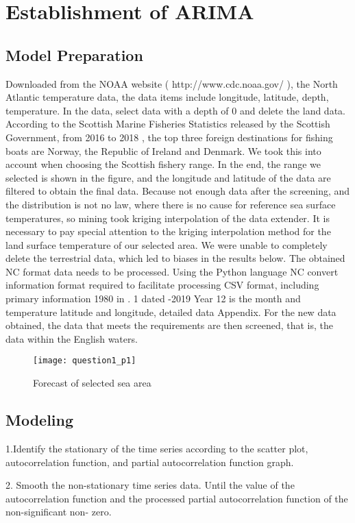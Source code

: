 \documentclass{mcmthesis}
\begin{document}
\section{Establishment of ARIMA}
\subsection{Model Preparation}
Downloaded from the NOAA website ( http://www.cdc.noaa.gov/ ), the North Atlantic temperature data, the data items include longitude, latitude, depth, temperature. In the data, select data with a depth of 0 and delete the land data. According to the Scottish Marine Fisheries Statistics released by the Scottish Government, from 2016 to 2018 , the top three foreign destinations for fishing boats are Norway, the Republic of Ireland and Denmark. We took this into account when choosing the Scottish fishery range. In the end, the range we selected is shown in the figure, and the longitude and latitude of the data are filtered to obtain the final data. Because not enough data after the screening, and the distribution is not no law, where there is no cause for reference sea surface temperatures, so mining took kriging interpolation of the data extender. It is necessary to pay special attention to the kriging interpolation method for the land surface temperature of our selected area. We were unable to completely delete the terrestrial data, which led to biases in the results below.
The obtained NC format data needs to be processed. Using the Python language NC convert information format required to facilitate processing CSV format, including primary information 1980 in . 1 dated -2019 Year 12 is the month and temperature latitude and longitude, detailed data Appendix.
For the new data obtained, the data that meets the requirements are then screened, that is, the data within the English waters.
\begin{figure}[h]
	\small
	\centering
	\texttt{[image: question1\_p1]}
	\caption{Forecast of selected sea area} \label{fig:aa}
\end{figure}

\subsection{Modeling}
1.Identify the stationary of the time series according to the scatter plot, autocorrelation function, and partial autocorrelation function graph.

2. Smooth the non-stationary time series data. Until the value of the autocorrelation function and the processed partial autocorrelation function of the non-significant non- zero.
\end{document}
